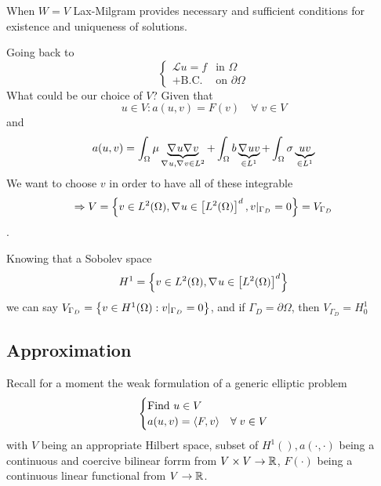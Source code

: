 When \(W=V\) Lax-Milgram provides necessary and sufficient conditions for existence and uniqueness of solutions.

Going back to 
\begin{equation*}
    \begin{cases}
        \mathcal{L}u = f & \text{in }\Omega \\
        + \text{B.C.} & \text{on }\partial\Omega
    \end{cases}
\end{equation*}
What could be our choice of \(V\)? Given that
\[
    u\in V : a(u,v) = F(v) \quad \forall \; v \in V
\]
and 
\[
    a(u,v) = \int_\Omega \mu \underbrace{\nabla\mspace{1mu} u \nabla\mspace{1mu} v}_{\nabla\mspace{1mu} u, \nabla\mspace{1mu} v \in L^2} + \int_\Omega b \underbrace{\nabla\mspace{1mu} u v}_{\in L^1} + \int_\Omega \sigma \underbrace{u v}_{\in L^1}
\]
We want to choose \(v\) in order to have all of these integrable \[\Rightarrow V = \left\{v \in L^2(\Omega), \nabla\mspace{1mu} u \in \left[L^2(\Omega)\right]^d, v\vert_{\Gamma_D} = 0\right\} = V_{\Gamma_D}\].

Knowing that a Sobolev space 
\[
    H^1 = \left\{v \in L^2(\Omega), \nabla\mspace{1mu} u \in \left[L^2(\Omega)\right]^d\right\}
\]
we can say \(V_{\Gamma_D} = \left\{v \in H^1(\Omega): v\vert_{\Gamma_D}= 0\right\}\), and if \(\Gamma_D = \partial\Omega\), then \(V_{\Gamma_D} = H^1_0\)
\subsection{Approximation}
Recall for a moment the weak formulation of a generic elliptic problem 
\begin{equation}
    \begin{cases}
        \text{Find } u \in V \\
        a(u,v) = \langle F,v \rangle & \forall \; v \in V \label{Weak Formulation of Boundary Value Problems - 2}
    \end{cases}
\end{equation}
with \(V\) being an appropriate Hilbert space, subset of \(H^1(), a(\cdot,\cdot)\) being a continuous and coercive bilinear forrm from \(V \times V \to \mathbb{R}\), \(F(\cdot)\) being a continuous linear functional from \(V \to \mathbb{R}\).

